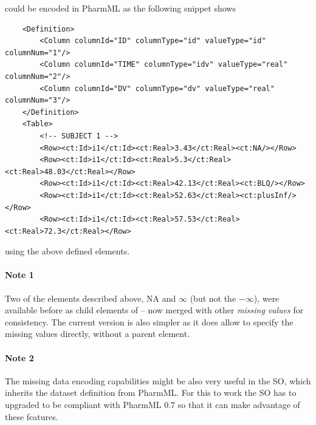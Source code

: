 could be encoded in PharmML as the following snippet shows
\lstset{language=XML}
\begin{lstlisting}
    <Definition>
        <Column columnId="ID" columnType="id" valueType="id" columnNum="1"/>
        <Column columnId="TIME" columnType="idv" valueType="real" columnNum="2"/>
        <Column columnId="DV" columnType="dv" valueType="real" columnNum="3"/>
    </Definition>
    <Table>
        <!-- SUBJECT 1 -->
        <Row><ct:Id>i1</ct:Id><ct:Real>3.43</ct:Real><ct:NA/></Row>
        <Row><ct:Id>i1</ct:Id><ct:Real>5.3</ct:Real><ct:Real>48.03</ct:Real></Row> 
        <Row><ct:Id>i1</ct:Id><ct:Real>42.13</ct:Real><ct:BLQ/></Row>
        <Row><ct:Id>i1</ct:Id><ct:Real>52.63</ct:Real><ct:plusInf/></Row>
        <Row><ct:Id>i1</ct:Id><ct:Real>57.53</ct:Real><ct:Real>72.3</ct:Real></Row>
\end{lstlisting}
using the above defined elements.

\paragraph{Note 1} Two of the elements described above, NA and $\infty$ (but not the $-\infty$), 
were available before as child elements of  -- now merged with 
other \emph{missing values} for consistency. The current version is also simpler 
as it does allow to specify the missing values directly, without a parent element.  
\paragraph{Note 2} The missing data encoding capabilities might be also very useful 
in the SO, which inherits the dataset definition from PharmML. For this to work the SO 
has to upgraded to be compliant with PharmML 0.7 so that it can make advantage of these features. 

